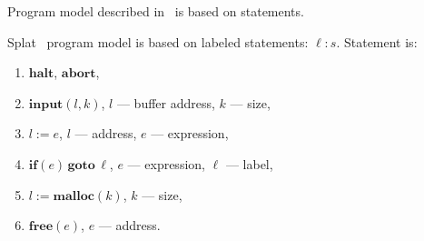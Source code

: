 
Program model described in~\cite{dta_fse} is based on statements.


Splat~\cite{splat} program model is based on labeled statements: $\ell: s$.
Statement is:
\begin{enumerate}[itemsep=-0.5ex]
    \item $\textbf{halt}$, $\textbf{abort}$,
    \item $\textbf{input}(l, k)$, $l$ --- buffer address, $k$ --- size,
    \item $l := e$, $l$ --- address, $e$ --- expression,
    \item $\textbf{if}(e)\,\textbf{goto}\, \ell$, $e$ --- expression,
        $\ell$ --- label,
    \item $l := \textbf{malloc}(k)$, $k$ --- size,
    \item $\textbf{free}(e)$, $e$ --- address.
\end{enumerate}

\setlength{\parskip}{0em}
\pagebreak
\tableofcontents
\pagebreak
\setlength{\parskip}{0.5em}

\printindex

{}



